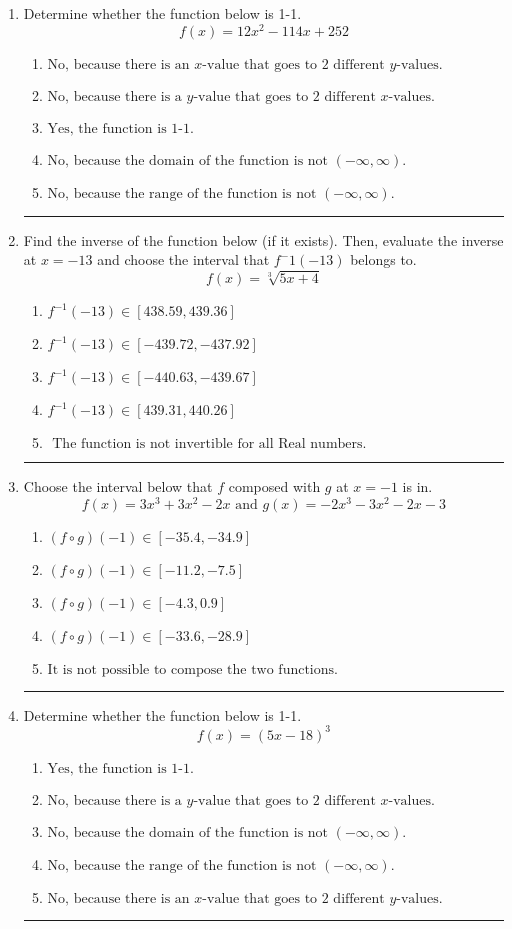 \documentclass[14pt]{extbook}
\newcommand{\litem}[1]{\item#1\hspace*{-1cm}\rule{\textwidth}{0.4pt}}
\begin{document}
\begin{enumerate}
{\begin{enumerate}[label=\Alph*.]
\end{enumerate} }
\litem{
Determine whether the function below is 1-1.\[ f(x) = 12 x^2 - 114 x + 252 \]\begin{enumerate}[label=\Alph*.]
\item \( \text{No, because there is an $x$-value that goes to 2 different $y$-values.} \)
\item \( \text{No, because there is a $y$-value that goes to 2 different $x$-values.} \)
\item \( \text{Yes, the function is 1-1.} \)
\item \( \text{No, because the domain of the function is not $(-\infty, \infty)$.} \)
\item \( \text{No, because the range of the function is not $(-\infty, \infty)$.} \)

\end{enumerate} }
\litem{
Find the inverse of the function below (if it exists). Then, evaluate the inverse at $x = -13$ and choose the interval that $f^-1(-13)$ belongs to.\[ f(x) = \sqrt[3]{5 x + 4} \]\begin{enumerate}[label=\Alph*.]
\item \( f^{-1}(-13) \in [438.59, 439.36] \)
\item \( f^{-1}(-13) \in [-439.72, -437.92] \)
\item \( f^{-1}(-13) \in [-440.63, -439.67] \)
\item \( f^{-1}(-13) \in [439.31, 440.26] \)
\item \( \text{ The function is not invertible for all Real numbers. } \)

\end{enumerate} }
\litem{
Choose the interval below that $f$ composed with $g$ at $x=-1$ is in.\[ f(x) = 3x^{3} +3 x^{2} -2 x \text{ and } g(x) = -2x^{3} -3 x^{2} -2 x -3 \]\begin{enumerate}[label=\Alph*.]
\item \( (f \circ g)(-1) \in [-35.4, -34.9] \)
\item \( (f \circ g)(-1) \in [-11.2, -7.5] \)
\item \( (f \circ g)(-1) \in [-4.3, 0.9] \)
\item \( (f \circ g)(-1) \in [-33.6, -28.9] \)
\item \( \text{It is not possible to compose the two functions.} \)

\end{enumerate} }
\litem{
Determine whether the function below is 1-1.\[ f(x) = (5 x - 18)^3 \]\begin{enumerate}[label=\Alph*.]
\item \( \text{Yes, the function is 1-1.} \)
\item \( \text{No, because there is a $y$-value that goes to 2 different $x$-values.} \)
\item \( \text{No, because the domain of the function is not $(-\infty, \infty)$.} \)
\item \( \text{No, because the range of the function is not $(-\infty, \infty)$.} \)
\item \( \text{No, because there is an $x$-value that goes to 2 different $y$-values.} \)


\end{enumerate}}
\end{enumerate}
\end{document}
